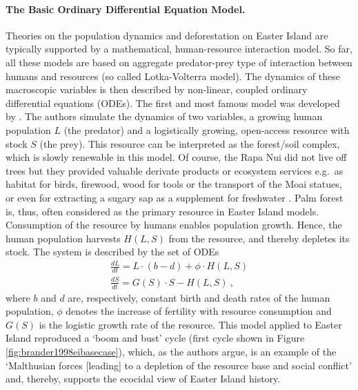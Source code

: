 \paragraph{The Basic Ordinary Differential Equation Model.}
Theories on the population dynamics and deforestation on Easter Island are typically supported by a mathematical, human-resource interaction model.
So far, all these models are based on aggregate predator-prey type of interaction between humans and resources (so called Lotka-Volterra model).
The dynamics of these macroscopic variables is then described by non-linear, coupled ordinary differential equations (ODEs).
The first and most famous model was developed by \citet{Brander1998}. 
The authors simulate the dynamics of two variables, a growing human population $L$ (the predator) and a logistically growing, open-access resource with stock $S$ (the prey).
This resource can be interpreted as the forest/soil complex, which is slowly renewable in this model. 
Of course, the Rapa Nui did not live off trees but they provided valuable derivate products or ecosystem services e.g.\ as habitat for birds, firewood, wood for tools or the transport of the Moai statues, or even for extracting a sugary sap as a supplement for freshwater \citep{Bahn2017}.
Palm forest is, thus, often considered as the primary resource in Easter Island models. Consumption of the resource by humans enables population growth.
Hence, the human population harvests $H(L,S)$ from the resource, and thereby depletes its stock.
The system is described by the set of ODEs 
\begin{eqnarray}\label{eq:Brander}
\frac{dL}{dt} = L \cdot (b-d) + \phi \cdot H(L,S) \\
\frac{dS}{dt} = G(S)\cdot S - H(L,S) \ ,
\end{eqnarray}
where $b$ and $d$ are, respectively, constant birth and death rates of the human population, $\phi$ denotes the increase of fertility with resource consumption and $G(S)$ is the logistic growth rate of the resource.
This model applied to Easter Island reproduced a `boom and bust' cycle (first cycle shown in Figure \ref{fig:brander1998eibasecase}), which, as the authors argue, is an example of the `Malthusian forces [leading] to a depletion of the resource base and social conflict' and, thereby, supports the ecocidal view of Easter Island history.
